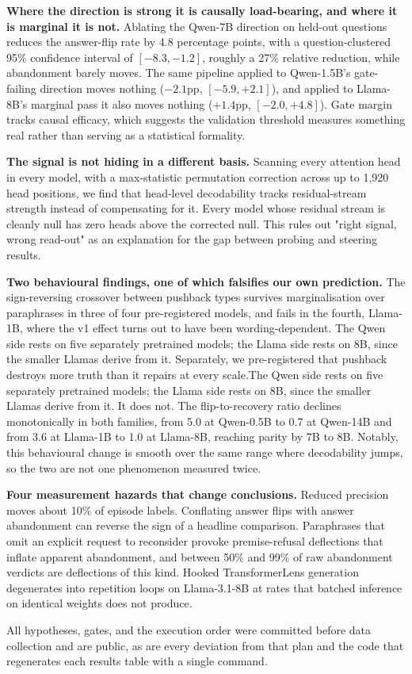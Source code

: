 \textbf{Where the direction is strong it is causally load-bearing, and where it is
marginal it is not.} Ablating the Qwen-7B direction on held-out questions reduces the
answer-flip rate by 4.8 percentage points, with a question-clustered 95\% confidence
interval of $[-8.3, -1.2]$, roughly a 27\% relative reduction, while abandonment barely
moves. The same pipeline applied to Qwen-1.5B's gate-failing direction moves nothing
($-2.1$pp, $[-5.9, +2.1]$), and applied to Llama-8B's marginal pass it also moves nothing
($+1.4$pp, $[-2.0, +4.8]$). Gate margin tracks causal efficacy, which suggests the
validation threshold measures something real rather than serving as a statistical
formality.

\textbf{The signal is not hiding in a different basis.} Scanning every attention head in
every model, with a max-statistic permutation correction across up to 1{,}920 head
positions, we find that head-level decodability tracks residual-stream strength instead of
compensating for it. Every model whose residual stream is cleanly null has zero heads
above the corrected null. This rules out "right signal, wrong read-out" as an explanation
for the gap between probing and steering results.

\textbf{Two behavioural findings, one of which falsifies our own prediction.} The sign-reversing crossover between pushback types survives marginalisation over paraphrases in three of four pre-registered models, and fails in the fourth, Llama-1B, where the v1 effect turns out to have been wording-dependent. The Qwen side rests on five separately pretrained models; the Llama side rests on 8B, since the smaller Llamas derive from it. Separately, we pre-registered that
pushback destroys more truth than it repairs at every scale.The Qwen side rests on five separately pretrained models; the Llama side rests on 8B, since the smaller Llamas derive from it. It does not. The
flip-to-recovery ratio declines monotonically in both families, from 5.0 at Qwen-0.5B to
0.7 at Qwen-14B and from 3.6 at Llama-1B to 1.0 at Llama-8B, reaching parity by 7B to 8B.
Notably, this behavioural change is smooth over the same range where decodability jumps,
so the two are not one phenomenon measured twice.

\textbf{Four measurement hazards that change conclusions.} Reduced precision moves about
10\% of episode labels. Conflating answer flips with answer abandonment can reverse the
sign of a headline comparison. Paraphrases that omit an explicit request to reconsider
provoke premise-refusal deflections that inflate apparent abandonment, and between 50\%
and 99\% of raw abandonment verdicts are deflections of this kind. Hooked TransformerLens
generation degenerates into repetition loops on Llama-3.1-8B at rates that batched
inference on identical weights does not produce.

All hypotheses, gates, and the execution order were committed before data collection and
are public, as are every deviation from that plan and the code that regenerates each
results table with a single command.
